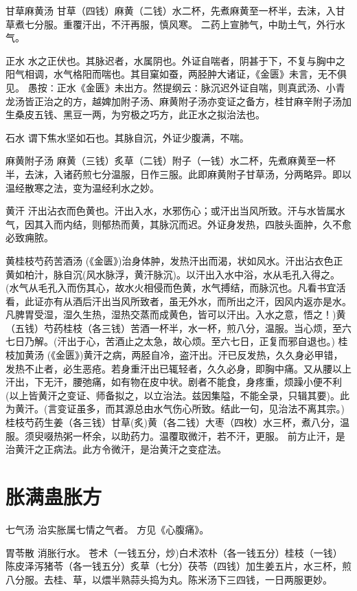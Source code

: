 \documentclass[a4paper,12pt,UTF8,twoside]{ctexbook}
\begin{document}
	甘草麻黄汤
	甘草（四钱）麻黄（二钱）水二杯，先煮麻黄至一杯半，去沫，入甘草煮七分服。重覆汗出，不汗再服，慎风寒。
	二药上宣肺气，中助土气，外行水气。
	
	
	正水	
	水之正伏也。其脉迟者，水属阴也。外证自喘者，阴甚于下，不复与胸中之阳气相调，水气格阳而喘也。其目窠如蚕，两胫肿大诸证，《金匮》未言，无不俱见。
	愚按∶正水《金匮》未出方。然提纲云∶脉沉迟外证自喘，则真武汤、小青龙汤皆正治之的方，越婢加附子汤、麻黄附子汤亦变证之备方，桂甘麻辛附子汤加生桑皮五钱、黑豆一两，为穷极之巧方，此正水之拟治法也。
	
	
	石水	
	谓下焦水坚如石也。其脉自沉，外证少腹满，不喘。
	
	麻黄附子汤
	麻黄（三钱）炙草（二钱）附子（一钱）水二杯，先煮麻黄至一杯半，去沫，入诸药煎七分温服，日作三服。此即麻黄附子甘草汤，分两略异。即以温经散寒之法，变为温经利水之妙。
	
	
	黄汗	
	汗出沾衣而色黄也。汗出入水，水邪伤心；或汗出当风所致。汗与水皆属水气，因其入而内结，则郁热而黄，其脉沉而迟。外证身发热，四肢头面肿，久不愈必致痈脓。
	
	黄桂枝芍药苦酒汤
	(《金匮》)治身体肿，发热汗出而渴，状如风水。汗出沾衣色正黄如柏汁，脉自沉(风水脉浮，黄汗脉沉)。以汗出入水中浴，水从毛孔入得之。(水气从毛孔入而伤其心，故水火相侵而色黄，水气搏结，而脉沉也。凡看书宜活看，此证亦有从酒后汗出当风所致者，虽无外水，而所出之汗，因风内返亦是水。凡脾胃受湿，湿久生热，湿热交蒸而成黄色，皆可以汗出。入水之意，悟之！)黄（五钱）芍药桂枝（各三钱）苦酒一杯半，水一杯，煎八分，温服。当心烦，至六七日乃解。(汗出于心，苦酒止之太急，故心烦。至六七日，正复而邪自退也。)
	桂枝加黄汤
	(《金匮》)黄汗之病，两胫自冷，盗汗出。汗已反发热，久久身必甲错，发热不止者，必生恶疮。若身重汗出已辄轻者，久久必身，即胸中痛。又从腰以上汗出，下无汗，腰弛痛，如有物在皮中状。剧者不能食，身疼重，烦躁小便不利(以上皆黄汗之变证、师备拟之，以立治法。兹因集隘，不能全录，只辑其要)。此为黄汗。(言变证虽多，而其源总由水气伤心所致。结此一句，见治法不离其宗。)桂枝芍药生姜（各三钱）甘草(炙)黄（各二钱）大枣（四枚）水三杯，煮八分，温服。须臾啜热粥一杯余，以助药力。温覆取微汗，若不汗，更服。
	前方止汗，是治黄汗之正病法。此方令微汗，是治黄汗之变症法。
	
	\section{胀满蛊胀方}
	   七气汤
	治实胀属七情之气者。
	方见《心腹痛》。
	
	胃苓散
	消胀行水。
	苍术（一钱五分，炒)白术浓朴（各一钱五分）桂枝（一钱）陈皮泽泻猪苓（各一钱五分）炙草（七分）茯苓（四钱）加生姜五片，水三杯，煎八分服。去桂、草，以煨半熟蒜头捣为丸。陈米汤下三四钱，一日两服更妙。
	
\end{document}
